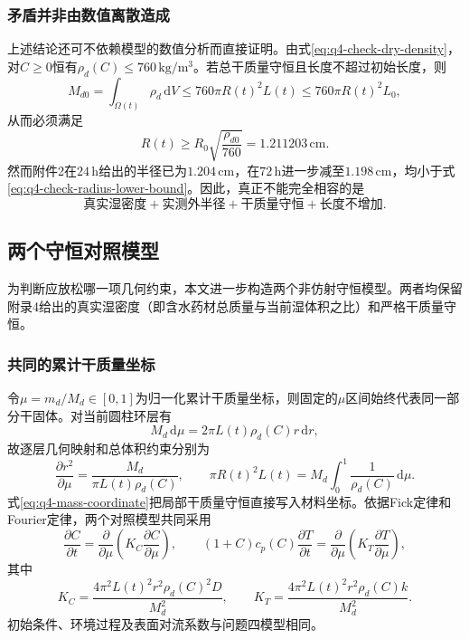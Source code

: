 \documentclass[withoutpreface,bwprint]{cumcmthesis}
\begin{document}
\subsubsection{矛盾并非由数值离散造成}

上述结论还可不依赖模型的数值分析而直接证明。由式\eqref{eq:q4-check-dry-density}，对$C\ge0$恒有$\rho_d(C)\le760\,\mathrm{kg/m^3}$。若总干质量守恒且长度不超过初始长度，则
\begin{equation}
M_{d0}=\int_{\Omega(t)}\rho_d\,\mathrm dV
\le760\pi R(t)^2L(t)
\le760\pi R(t)^2L_0,
\end{equation}
从而必须满足
\begin{equation}
\boxed{
R(t)\ge R_0\sqrt{\frac{\rho_{d0}}{760}}
=1.211203\,\mathrm{cm}.
}
\label{eq:q4-check-radius-lower-bound}
\end{equation}
然而附件2在$24\,\mathrm h$给出的半径已为$1.204\,\mathrm{cm}$，在$72\,\mathrm h$进一步减至$1.198\,\mathrm{cm}$，均小于式\eqref{eq:q4-check-radius-lower-bound}。因此，真正不能完全相容的是
\[
\boxed{\text{真实湿密度}+\text{实测外半径}+\text{干质量守恒}+\text{长度不增加}}.
\]

\subsection{两个守恒对照模型}

为判断应放松哪一项几何约束，本文进一步构造两个非仿射守恒模型。两者均保留附录4给出的真实湿密度（即含水药材总质量与当前湿体积之比）和严格干质量守恒。

\subsubsection{共同的累计干质量坐标}

令$\mu=m_d/M_d\in[0,1]$为归一化累计干质量坐标，则固定的$\mu$区间始终代表同一部分干固体。对当前圆柱环层有
\begin{equation}
M_d\,\mathrm d\mu
=2\pi L(t)\rho_d(C)r\,\mathrm dr,
\label{eq:q4-mass-coordinate}
\end{equation}
故逐层几何映射和总体积约束分别为
\begin{equation}
\frac{\partial r^2}{\partial\mu}
=\frac{M_d}{\pi L(t)\rho_d(C)},
\qquad
\pi R(t)^2L(t)
=M_d\int_0^1\frac{1}{\rho_d(C)}\,\mathrm d\mu.
\label{eq:q4-common-geometry}
\end{equation}
式\eqref{eq:q4-mass-coordinate}把局部干质量守恒直接写入材料坐标。依据Fick定律和Fourier定律\cite{fick1855,crank1975,bird2002}，两个对照模型共同采用
\begin{equation}
\frac{\partial C}{\partial t}
=\frac{\partial}{\partial\mu}
\left(K_C\frac{\partial C}{\partial\mu}\right),
\qquad
(1+C)c_p(C)\frac{\partial T}{\partial t}
=\frac{\partial}{\partial\mu}
\left(K_T\frac{\partial T}{\partial\mu}\right),
\label{eq:q4-mass-coordinate-pde}
\end{equation}
其中
\begin{equation}
K_C=\frac{4\pi^2L(t)^2r^2\rho_d(C)^2D}{M_d^2},
\qquad
K_T=\frac{4\pi^2L(t)^2r^2\rho_d(C)k}{M_d^2}.
\label{eq:q4-mass-coordinate-coefficients}
\end{equation}
初始条件、环境过程及表面对流系数与问题四模型相同。
\end{document}
